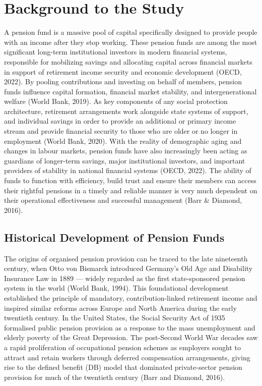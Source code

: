 \documentclass[12pt,a4paper]{article}
\begin{document}
\vspace{1cm}

\section{Background to the Study}

A pension fund is a massive pool of capital specifically designed to provide people with an income after they stop working. These pension funds are among the most significant long-term institutional investors in modern financial systems, responsible for mobilizing savings and allocating capital across financial markets in support of retirement income security and economic development (OECD, 2022). By pooling contributions and investing on behalf of members, pension funds influence capital formation, financial market stability, and intergenerational welfare (World Bank, 2019). As key components of any social protection architecture, retirement arrangements work alongside state systems of support, and individual savings in order to provide an additional or primary income stream and provide financial security to those who are older or no longer in employment (World Bank, 2020). With the reality of demographic aging and changes in labour markets, pension funds have also increasingly been acting as guardians of longer-term savings, major institutional investors, and important providers of stability in national financial systems (OECD, 2022). The ability of funds to function with efficiency, build trust and ensure their members can access their rightful pensions in a timely and reliable manner is very much dependent on their operational effectiveness and successful management (Barr \& Diamond, 2016).

\subsection{Historical Development of Pension Funds}

The origins of organised pension provision can be traced to the late nineteenth century, when Otto von Bismarck introduced Germany's Old Age and Disability Insurance Law in 1889 --- widely regarded as the first state-sponsored pension system in the world (World Bank, 1994). This foundational development established the principle of mandatory, contribution-linked retirement income and inspired similar reforms across Europe and North America during the early twentieth century. In the United States, the Social Security Act of 1935 formalised public pension provision as a response to the mass unemployment and elderly poverty of the Great Depression. The post-Second World War decades saw a rapid proliferation of occupational pension schemes as employers sought to attract and retain workers through deferred compensation arrangements, giving rise to the defined benefit (DB) model that dominated private-sector pension provision for much of the twentieth century (Barr and Diamond, 2016).
\end{document}
